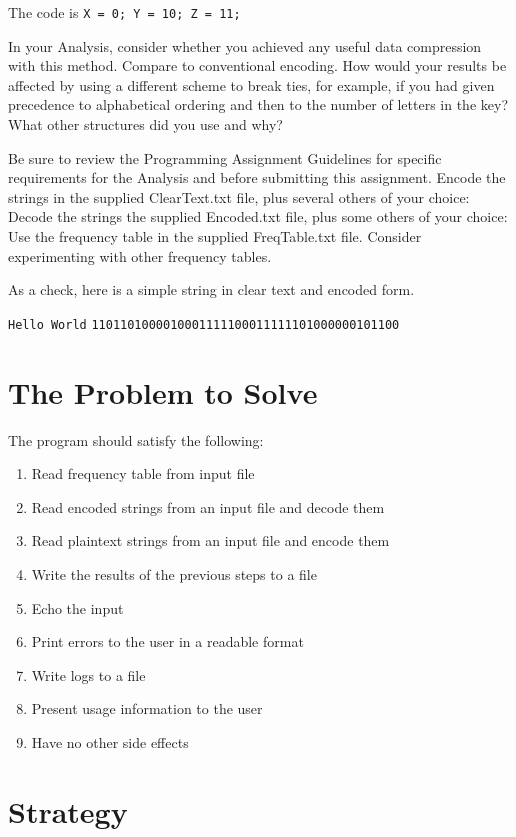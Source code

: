 \documentclass[10pt,letterpaper,final]{report}
\begin{document}
\medskip
The code is \texttt{X = 0; Y = 10; Z = 11;}
\medskip

In your Analysis, consider whether you achieved any useful data compression with this method. Compare to conventional encoding. How would your results be affected by using a different scheme to break ties, for example, if you had given precedence to alphabetical ordering and then to the number of letters in the key? What other structures did you use and why?

Be sure to review the Programming Assignment Guidelines for specific requirements for the Analysis and before submitting this assignment.
Encode the strings in the supplied ClearText.txt file, plus several others of your choice:
Decode the strings the supplied Encoded.txt file, plus some others of your choice:
Use the frequency table in the supplied FreqTable.txt file. Consider experimenting with other
frequency tables.

As a check, here is a simple string in clear text and encoded form.

\texttt{Hello World}
\texttt{1101101000010001111100011111101000000101100}

\tableofcontents

\pagebreak

\section{The Problem to Solve}

The program should satisfy the following:

\begin{enumerate}
  \item Read frequency table from input file
  \item Read encoded strings from an input file and decode them
  \item Read plaintext strings from an input file and encode them
  \item Write the results of the previous steps to a file
  \item Echo the input
  \item Print errors to the user in a readable format
  \item Write logs to a file
  \item Present usage information to the user
  \item Have no other side effects
\end{enumerate}

\section{Strategy}\label{sec:strategy}
\end{document}
